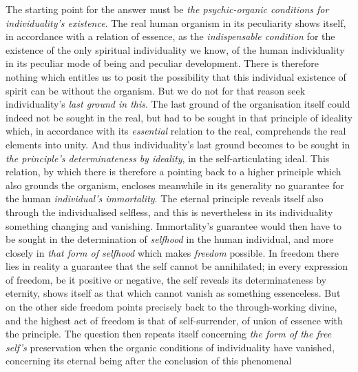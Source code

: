 \documentclass[12pt,a4paper]{book}
\begin{document}
The starting point for the answer must be \emph{the psychic-organic conditions
for individuality's existence}. The real human organism in its peculiarity
shows itself, in accordance with a relation of essence, as the
\emph{indispensable condition} for the existence of the only spiritual
individuality we know, of the human individuality in its peculiar mode of being
and peculiar development. There is therefore nothing which entitles us to posit
the possibility that this individual existence of spirit can be without the
organism. But we do not for that reason seek individuality's \emph{last ground
in this}. The last ground of the organisation itself could indeed not be sought
in the real, but had to be sought in that principle of ideality which, in
accordance with its \emph{essential} relation to the real, comprehends the real
elements into unity. And thus individuality's last ground becomes
to be sought in \emph{the principle's determinateness by ideality}, in the
self-articulating ideal. This relation, by which there is therefore a pointing
back to a higher principle which also grounds the organism, encloses meanwhile
in its generality no guarantee for the human \emph{individual's immortality}.
The eternal principle reveals itself also through the individualised selfless,
and this is nevertheless in its individuality something changing and vanishing.
Immortality's guarantee would then have to be sought in the determination of
\emph{selfhood} in the human individual, and more closely in \emph{that form of
selfhood} which makes \emph{freedom} possible. In freedom there lies in reality
a guarantee that the self cannot be annihilated; in every expression of freedom,
be it positive or negative, the self reveals its determinateness by eternity,
shows itself as that which cannot vanish as something essenceless. But on the
other side freedom points precisely back to the through-working divine, and the
highest act of freedom is that of self-surrender, of union of essence with the
principle. The question then repeats itself concerning \emph{the form of the
free self's} preservation when the organic conditions of individuality have
vanished, concerning its eternal being after the conclusion of this phenomenal
\end{document}

